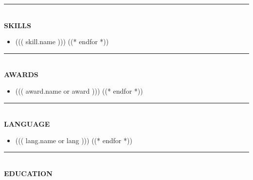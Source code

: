 \documentclass[11pt,a4paper]{article}
\begin{document}
\begin{minipage}[t]{\textwidth}
\begin{minipage}[t]{0.9\textwidth}
\begin{minipage}[t]{0.28\textwidth}
\vspace{0pt}

{\color{teal-pri}\rule{\linewidth}{1.5pt}}\\[2pt]
{\fontsize{10}{12}\selectfont\color{teal-pri}\bfseries SKILLS}\\[10pt]
\begin{itemize}[leftmargin=8pt, itemsep=4pt, parsep=0pt, topsep=0pt]
((* for skill in skills *))
\item {\fontsize{8.5}{10}\selectfont ((( skill.name )))}
((* endfor *))
\end{itemize}
\vspace{20pt}

{\color{teal-pri}\rule{\linewidth}{1.5pt}}\\[2pt]
{\fontsize{10}{12}\selectfont\color{teal-pri}\bfseries AWARDS}\\[10pt]
\begin{itemize}[leftmargin=8pt, itemsep=4pt, parsep=0pt, topsep=0pt]
((* for award in awards *))
\item {\fontsize{8.5}{10}\selectfont ((( award.name or award )))}
((* endfor *))
\end{itemize}
\vspace{20pt}

{\color{teal-pri}\rule{\linewidth}{1.5pt}}\\[2pt]
{\fontsize{10}{12}\selectfont\color{teal-pri}\bfseries LANGUAGE}\\[10pt]
\begin{itemize}[leftmargin=8pt, itemsep=4pt, parsep=0pt, topsep=0pt]
((* for lang in languages *))
\item {\fontsize{8.5}{10}\selectfont ((( lang.name or lang )))}
((* endfor *))
\end{itemize}

\end{minipage}
\hfill
\begin{minipage}[t]{0.68\textwidth}
\vspace{0pt}

{\color{teal-pri}\rule{\linewidth}{1.5pt}}\\[2pt]
{\fontsize{10}{12}\selectfont\color{teal-pri}\bfseries EDUCATION}\\[15pt]


\end{minipage}
\end{minipage}
\end{minipage}
\end{document}
